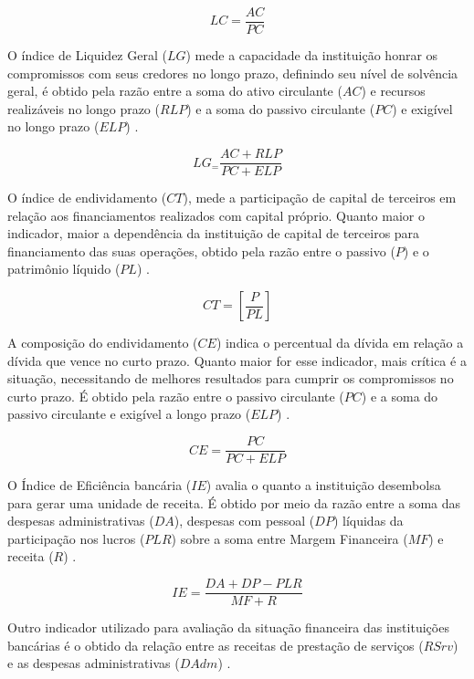 \documentclass[
  12pt,
  12pt,
  openright,
  oneside,
  a4paper,
  chapter=TITLE,
  section=TITLE,
  subsection=TITLE,
  subsubsection=TITLE,
  english,
  portugues,
  sumario=tradicional]{abntex2}
\begin{document}
\begin{equation}
LC = \frac{AC}{PC}
\end{equation}

O índice de Liquidez Geral (\(LG\)) mede a capacidade da instituição honrar os compromissos com seus credores no longo prazo, definindo seu nível de solvência geral, é obtido pela razão entre a soma do ativo circulante (\(AC\)) e recursos realizáveis no longo prazo (\(RLP\)) e a soma do passivo circulante (\(PC\)) e exigível no longo prazo (\(ELP\)) \cite{assaf:2020}.

\begin{equation}
LG_ = \frac{AC + RLP}{PC + ELP}
\end{equation}

O índice de endividamento (\(CT\)), mede a participação de capital de terceiros em relação aos financiamentos realizados com capital próprio. Quanto maior o indicador, maior a dependência da instituição de capital de terceiros para financiamento das suas operações, obtido pela razão entre o passivo (\(P\)) e o patrimônio líquido (\(PL\)) \cite{assaf:2020}.

\begin{equation}
CT = [\frac{P}{PL}]
\end{equation}

A composição do endividamento (\(CE\)) indica o percentual da dívida em relação a dívida que vence no curto prazo. Quanto maior for esse indicador, mais crítica é a situação, necessitando de melhores resultados para cumprir os compromissos no curto prazo. É obtido pela razão entre o passivo circulante (\(PC\)) e a soma do passivo circulante e exigível a longo prazo (\(ELP\)) \cite{assaf:2020}.

\begin{equation}
CE = \frac{PC}{PC + ELP}
\end{equation}

O Índice de Eficiência bancária (\(IE\)) avalia o quanto a instituição desembolsa para gerar uma unidade de receita. É obtido por meio da razão entre a soma das despesas administrativas (\(DA\)), despesas com pessoal (\(DP\)) líquidas da participação nos lucros (\(PLR\)) sobre a soma entre Margem Financeira (\(MF\)) e receita (\(R\)) \cite{timotio:2018}.

\begin{equation}
IE = \frac{DA + DP - PLR}{MF + R} 
\end{equation}

Outro indicador utilizado para avaliação da situação financeira das instituições bancárias é o obtido da relação entre as receitas de prestação de serviços (\(RSrv\)) e as despesas administrativas (\(DAdm\)) \cite{dantas:2012}.
\end{document}
